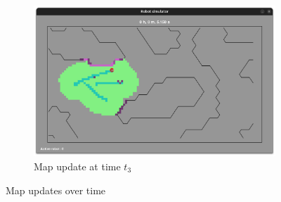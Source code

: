 \documentclass[../main.tex]{subfiles}
\begin{document}
\begin{figure}[H]
\begin{subfigure}{0.4\textwidth}
		\includegraphics[width=\textwidth]{IMAGES/part5/lgm_t3.png}
		\caption{Map update at time $t_3$}
	\end{subfigure}
	\caption{Map updates over time}
	\label{fig:map_updates}
\end{figure}
\end{document}
